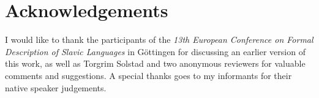 \documentclass[output=paper,
colorlinks,
citecolor=brown,
newtxmath
]{langscibook}
\begin{document}
\section*{Acknowledgements}
I would like to thank the participants of the \textit{13th European Conference on
Formal Description of Slavic Languages} in Göttingen for discussing an earlier version of this work, as well as Torgrim Solstad and two anonymous reviewers for valuable comments and suggestions. A special thanks goes to my informants for their native speaker judgements.
%
\sloppy
\printbibliography[heading=subbibliography,notkeyword=this]
\end{document}
